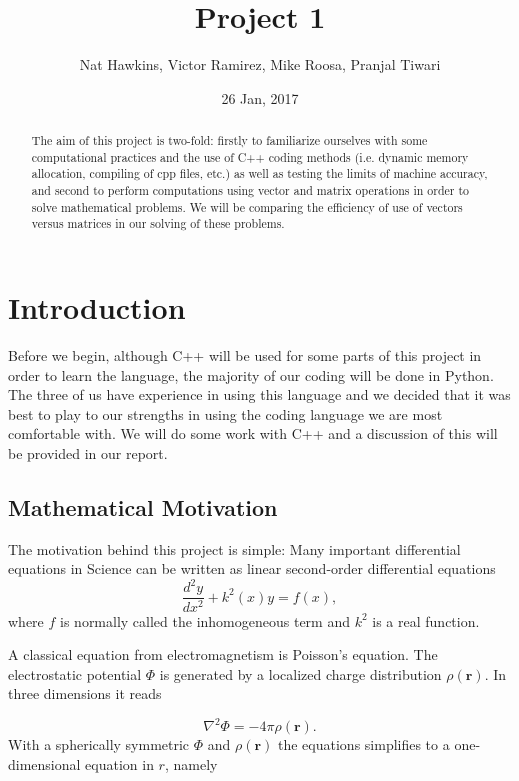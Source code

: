 \documentclass{article}
\title{Project 1}
\author{Nat Hawkins, Victor Ramirez, Mike Roosa, Pranjal Tiwari}
\date{26 Jan, 2017}
\begin{document}
\maketitle

\begin{abstract}
	The aim of this project is two-fold: firstly to familiarize ourselves with some computational practices and the use of C++ coding methods (i.e. dynamic memory allocation, compiling of cpp files, etc.) as well as testing the limits of machine accuracy, and second to perform computations using vector and matrix operations in order to solve mathematical problems. We will be comparing the efficiency of use of vectors versus matrices in our solving of these problems.
\end{abstract}

\section{Introduction}
	Before we begin, although C++ will be used for some parts of this project in order to learn the language, the majority of our coding will be done in Python. The three of us have experience in using this language and we decided that it was best to play to our strengths in using the coding language we are most comfortable with. We will do some work with C++ and a discussion of this will be provided in our report. 
	
	\subsection{Mathematical Motivation}
		The motivation behind this project is simple: Many important differential equations in  Science can be written as 	linear second-order differential equations
		\begin{equation*}
		\frac{d^2y}{dx^2}+k^2(x)y = f(x),
		\end{equation*}
		where $f$ is normally called the inhomogeneous term and $k^2$ is a real function.
		
		A classical equation from electromagnetism is Poisson's equation.	The electrostatic potential $\Phi$ is generated by a localized charge distribution $\rho (\mathbf{r})$.   In three dimensions it reads
		
		\begin{equation*}
		\nabla^2 \Phi = -4\pi \rho (\mathbf{r}).
		\end{equation*}
		With a spherically symmetric $\Phi$ and $\rho (\mathbf{r})$  the equations
		simplifies to a one-dimensional equation in $r$, namely
		
\end{document}
